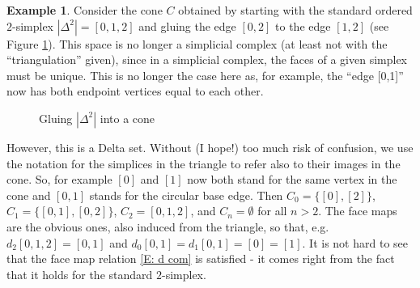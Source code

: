 \documentclass[12pt]{article}
\theoremstyle{plain}
\theoremstyle{definition}
\newtheorem{example}[theorem]{Example}
\begin{document}
\begin{example}\label{E: cone}
Consider the cone $C$ obtained by starting with the standard ordered $2$-simplex $|\Delta^2|=[0,1,2]$ and gluing the edge $[0,2]$ to the edge $[1,2]$ (see Figure \ref{F: fig6}). This space is no longer a simplicial complex (at least not with the ``triangulation'' given), since in a simplicial complex, the faces of a given simplex must be unique. This is no longer the case here as, for example, the ``edge [0,1]'' now has both endpoint vertices equal to each other. 


\begin{figure}[!htp]
\begin{center}
\end{center}
\caption{Gluing $|\Delta^2|$ into a cone}\label{F: fig6}
\end{figure}

However, this is a Delta set. Without (I hope!) too much risk of confusion, we use the notation for the simplices in the triangle to refer also to their images in the cone. So, for example $[0]$ and $[1]$ now both stand for the same vertex in the cone and $[0,1]$ stands for the circular base edge. Then $C_0=\{[0],[2]\}$, $C_1=\{[0,1], [0,2]\}$, $C_2=[0,1,2]$, and $C_n=\emptyset$ for all $n>2$. The face maps are the obvious ones, also induced from the triangle, so that, e.g. $d_2[0,1,2]=[0,1]$ and $d_0[0,1]=d_1[0,1]=[0]=[1]$. It is not hard to see that the face map relation \eqref{E: d com} is satisfied - it comes right from the fact that it holds for the standard $2$-simplex.
\end{example}  
\end{document}
